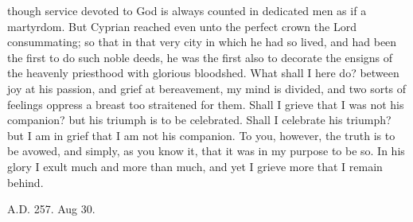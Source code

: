 though service devoted to God is always counted in dedicated men as if
a martyrdom. But Cyprian reached even unto the perfect crown the Lord
consummating; so that in that very city in which he had so lived, and
had been the first to do such noble deeds, he was the first also to
decorate the ensigns of the heavenly priesthood with glorious
bloodshed. What shall I here do? between joy at his passion, and grief
at bereavement, my mind is divided, and two sorts of feelings oppress
a breast too straitened for them. Shall I grieve that I was not his
companion? but his triumph is to be celebrated. Shall I celebrate his
triumph? but I am in grief that I am not his companion. To you,
however, the truth is to be avowed, and simply, as you know it, that
it was in my purpose to be so. In his glory I exult much and more than
much, and yet I grieve more that I remain behind.


A.D. 257. Aug 30.


